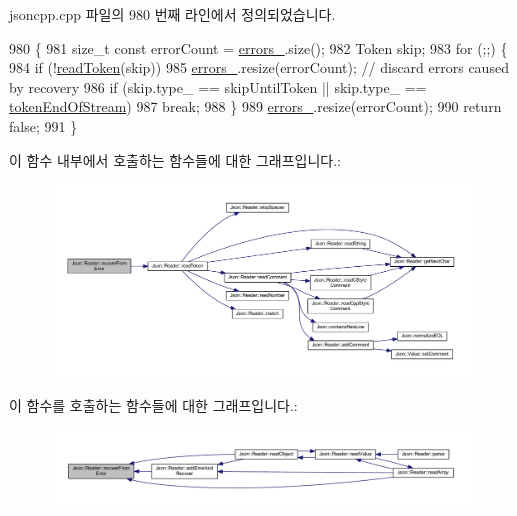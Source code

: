 jsoncpp.\+cpp 파일의 980 번째 라인에서 정의되었습니다.


\begin{DoxyCode}
980                                                       \{
981   \textcolor{keywordtype}{size\_t} \textcolor{keyword}{const} errorCount = \hyperlink{class_json_1_1_reader_a1bbce45dc4df753bed60c129f4b5147c}{errors\_}.size();
982   Token skip;
983   \textcolor{keywordflow}{for} (;;) \{
984     \textcolor{keywordflow}{if} (!\hyperlink{class_json_1_1_reader_a7cb0631963cc0fd4ff6ed0f570976864}{readToken}(skip))
985       \hyperlink{class_json_1_1_reader_a1bbce45dc4df753bed60c129f4b5147c}{errors\_}.resize(errorCount); \textcolor{comment}{// discard errors caused by recovery}
986     \textcolor{keywordflow}{if} (skip.type\_ == skipUntilToken || skip.type\_ == \hyperlink{class_json_1_1_reader_aa35e6ab574dc399a0a645ad98ed66bc9a87fd3ad9cae11a8afe2bd022d8ab90f4}{tokenEndOfStream})
987       \textcolor{keywordflow}{break};
988   \}
989   \hyperlink{class_json_1_1_reader_a1bbce45dc4df753bed60c129f4b5147c}{errors\_}.resize(errorCount);
990   \textcolor{keywordflow}{return} \textcolor{keyword}{false};
991 \}
\end{DoxyCode}
이 함수 내부에서 호출하는 함수들에 대한 그래프입니다.\+:\nopagebreak
\begin{figure}[H]
\begin{center}
\leavevmode
\includegraphics[width=350pt]{class_json_1_1_reader_a8d4ed03a43082c5ace81ba5b81425eaf_cgraph}
\end{center}
\end{figure}
이 함수를 호출하는 함수들에 대한 그래프입니다.\+:\nopagebreak
\begin{figure}[H]
\begin{center}
\leavevmode
\includegraphics[width=350pt]{class_json_1_1_reader_a8d4ed03a43082c5ace81ba5b81425eaf_icgraph}
\end{center}
\end{figure}
\mbox{\label{class_json_1_1_reader_a22e677ef400d8223f27e631b4cd4b821}} 

